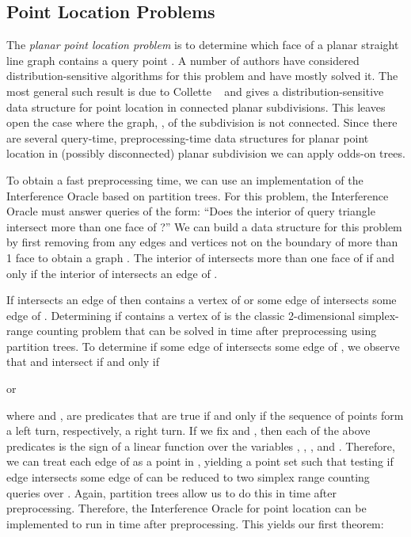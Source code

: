 \documentclass{patmorin}
\begin{document}
\subsection{Point Location Problems}

The \emph{planar point location problem} is to determine which face
of a planar straight line graph  contains a query point .
A number of authors have considered distribution-sensitive algorithms for
this problem \cite{acmr00,amm00,amm01a,amm01b,ammw07,cdilm08,i01,i04}
and have mostly solved it.  The most general such result is due to
Collette \etal\ \cite{cdilm08} and gives a distribution-sensitive
data structure for point location in connected planar subdivisions.
This leaves open the case where the graph, , of the subdivision is not
connected.  Since there are several  query-time, 
preprocessing-time data structures for planar point location in (possibly
disconnected) planar subdivision \cite{as98,egs86,k83,m90,st86} we can
apply odds-on trees.

To obtain a fast preprocessing time, we can use an
implementation of the Interference Oracle based on partition trees.  For
this problem, the Interference Oracle must answer queries of the form:
``Does the interior of query triangle  intersect more than one face
of ?''  We can build a data structure for this problem by first removing
from  any edges and vertices not on the boundary of more than 1 face to
obtain a graph .  The interior of  intersects more than one
face of  if and only if the interior of  intersects an edge of
.

If  intersects an edge of  then  contains a vertex of
 or some edge of  intersects some edge of .  Determining if
 contains a vertex of  is the classic 2-dimensional
simplex-range counting problem that can be solved in 
time after  preprocessing using partition trees.  To determine
if some edge  of  intersects some edge  of , we observe
that  and  intersect if and only if

or

where  and , are predicates that are true if and
only if the sequence of points  form a left turn, respectively, a
right turn.  If we fix  and , then each of the above predicates is
the sign of a linear function over the variables , , ,
and .  Therefore, we can treat each edge of  as a point in
, yielding a point set  such that testing if
edge  intersects some edge of  can be reduced to two simplex
range counting queries over .  Again, partition trees allow us to
do this in  time after  preprocessing.
Therefore, the Interference Oracle for point location can be implemented
to run in  time after  preprocessing.
This yields our first theorem:
\end{document}
